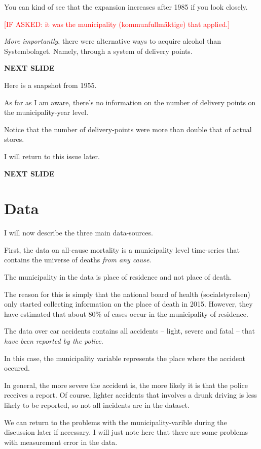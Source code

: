 \documentclass[12pt]{article}
\newcommand{\TODO}[1]{\textcolor{red}{[#1]}}
\begin{document}
 You can kind of see that the expansion increases after 1985 if you look closely.

 \TODO{IF ASKED: it was the municipality (kommunfullmäktige) that applied.}

\emph{More importantly}, there were alternative ways to acquire alcohol than Systembolaget. Namely, through a system of delivery points.

\textbf{NEXT SLIDE}

Here is a snapshot from 1955. 

As far as I am aware, there's no information on the number of delivery points on the municipality-year level. 

Notice that the number of delivery-points were more than double that of actual stores.

I will return to this issue later.

\textbf{NEXT SLIDE}

\section{Data}

I  will now describe the three main data-sources.

First, the data on all-cause mortality is a municipality level time-series that contains the universe of deaths \emph{from any cause}. 

The municipality in the data is place of residence and not place of death. 

The reason for this is simply that the national board of health (socialstyrelsen) only started collecting information on the place of death in 2015. However, they have estimated that about 80\% of cases occur in the municipality of residence.

The data over car accidents contains all accidents -- light, severe and fatal -- that \emph{have been reported by the police}. 

In this case, the municipality variable represents the place where the accident occured. 

In general, the more severe the accident is, the more likely it is that the police receives a report. Of course, lighter accidents that involves a drunk driving is less likely to be reported, so not all incidents are in the dataset.

We can return to the problems with the municipality-varible during the discussion later if necessary. I will just note here that there are some problems with measurement error in the data.
\end{document}
